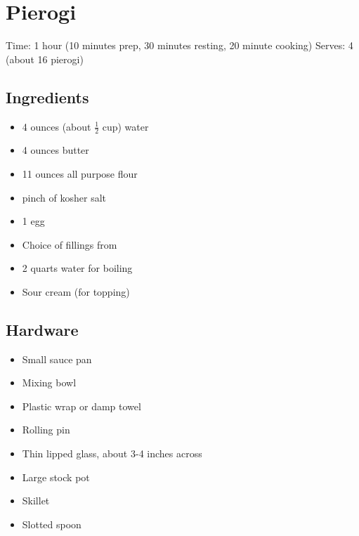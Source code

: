 \section{Pierogi}
\label{pierogi}
\setcounter{secnumdepth}{0}
Time: 1 hour (10 minutes prep, 30 minutes resting, 20 minute cooking)
Serves: 4 (about 16 pierogi)

\begin{multicols}{2}
\subsection*{Ingredients}
\begin{itemize}
    \item 4 ounces (about \( \frac{1}{2} \) cup) water
    \item 4 ounces butter
    \item 11 ounces all purpose flour
    \item pinch of kosher salt
    \item 1 egg
    \item Choice of fillings from 
    \item 2 quarts water for boiling
    \item Sour cream (for topping)
\end{itemize}

\subsection*{Hardware}
\begin{itemize}
    \item Small sauce pan
    \item Mixing bowl
    \item Plastic wrap or damp towel
    \item Rolling pin
    \item Thin lipped glass, about 3-4 inches across
    \item Large stock pot
    \item Skillet
    \item Slotted spoon
\end{itemize}
\clearpage


\end{multicols}
